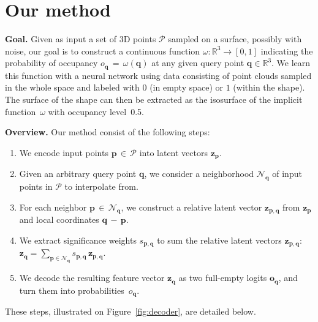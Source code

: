 \documentclass[10pt,twocolumn,letterpaper]{article}
\newcommand{\latentv}{{\mathbf{z}}}
\newcommand{\neighbors}{{\mathcal{N}}}
\newcommand{\occupancy}{\mathbf{o}}
\newcommand{\occupancyp}{{o}}
\newcommand{\occupancyf}{{\omega}}
\newcommand{\pointcloud}{{\mathcal{P}}}
\newcommand{\point}{{\mathbf{p}}}
\newcommand{\qpoint}{{\mathbf{q}}}
\newcommand{\Real}{{\mathbb{R}}}
\newcommand{\significance}{s}
\begin{document}
\section{Our method}

\textbf{Goal.} Given as input a set of  3D points $\pointcloud$ sampled on a surface, possibly with noise, our goal is to construct a continuous function $\occupancyf:\Real^3 \rightarrow [0,1]$ indicating the probability of occupancy $\occupancyp_\qpoint \,{=}\, \occupancyf(\qpoint)$ at any given query point $\qpoint \in \Real^3$. We learn this function with a neural network using data consisting of point clouds sampled in the whole space and labeled with $0$ (in empty space) or $1$ (within the shape). The surface of the shape can then be extracted as the isosurface of the implicit function~$\occupancyf$ with occupancy level~0.5.

\textbf{Overview.} Our method consist of the following steps:
\begin{enumerate}[itemsep=-2pt,topsep=-1pt]

    \item We encode input points $\point \,{\in}\, \pointcloud$ into latent vectors $\latentv_\point$.
    
    \item Given an arbitrary query point $\qpoint$, we consider a neighborhood $\neighbors_\qpoint$ of input points in $\pointcloud$ to  interpolate from.

    \item For each neighbor $\point \,{\in}\, \neighbors_\qpoint$, we construct a relative latent vector $\latentv_{\point,\qpoint}$ from $\latentv_\point$ and local coordinates $\qpoint \,{-}\, \point$.\label{decodefirst}
    
    \item We extract significance weights $\significance_{\point,\qpoint}$ to sum the relative latent vectors $\latentv_{\point,\qpoint}$: $\latentv_\qpoint = \sum_{\point \in \neighbors_\qpoint} \significance_{\point,\qpoint} \,\latentv_{\point,\qpoint}$.
    
    \item We decode the resulting feature vector $\latentv_\qpoint$ as two full-empty logits $\occupancy_\qpoint$, and turn them into probabilities~$\occupancyp_\qpoint$.
    \label{decodelast}
    
\end{enumerate}\vspace{3pt}
These steps, illustrated on Figure~\ref{fig:decoder}, are detailed below.
\end{document}
